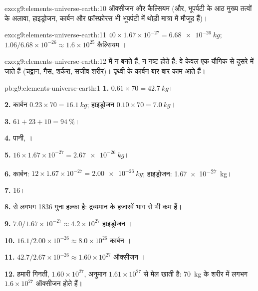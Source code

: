 \begin{solution}{exo:g9:elements-universe-earth:10}
ऑक्सीजन और कैल्सियम (और, भूपर्पटी के आठ मुख्य तत्वों के अलावा,
हाइड्रोजन, कार्बन और फ़ॉस्फ़ोरस भी भूपर्पटी में थोड़ी मात्रा में
मौजूद हैं)।
\end{solution}

\begin{solution}{exo:g9:elements-universe-earth:11}
$40 \times 1.67 \times 10^{-27} = \qty{6.68e-26}{kg}$;
$1.06 / 6.68 \times 10^{-26} \approx 1.6 \times 10^{25}$ कैल्सियम ।
\end{solution}

\begin{solution}{exo:g9:elements-universe-earth:12}
 में  न बनते हैं, न नष्ट होते हैं: वे केवल एक यौगिक से
दूसरे में जाते हैं (चट्टान, गैस, शर्करा, सजीव शरीर)। पृथ्वी के
कार्बन  बार-बार काम आते हैं।
\end{solution}

\begin{solution}{pb:g9:elements-universe-earth:1}
\textbf{1.} $0.61 \times 70 = \qty{42.7}{kg}$।

\textbf{2.} कार्बन $0.23 \times 70 = \qty{16.1}{kg}$; हाइड्रोजन
$0.10 \times 70 = \qty{7.0}{kg}$।

\textbf{3.} $61 + 23 + 10 = \qty{94}{\percent}$।

\textbf{4.} पानी, ।

\textbf{5.} $16 \times 1.67 \times 10^{-27} = \qty{2.67e-26}{kg}$।

\textbf{6.} कार्बन: $12 \times 1.67 \times 10^{-27} = \qty{2.00e-26}{kg}$;
हाइड्रोजन: \qty{1.67e-27}{kg}।

\textbf{7.} 16।

\textbf{8.}   से लगभग 1836 गुना हल्का है: 
द्रव्यमान के हज़ारवें भाग से भी कम हैं।

\textbf{9.} $7.0 / 1.67 \times 10^{-27} \approx 4.2 \times 10^{27}$
हाइड्रोजन ।

\textbf{10.} $16.1 / 2.00 \times 10^{-26} \approx 8.0 \times 10^{26}$
कार्बन ।

\textbf{11.} $42.7 / 2.67 \times 10^{-26} \approx 1.60 \times 10^{27}$
ऑक्सीजन ।

\textbf{12.} हमारी गिनती, $1.60 \times 10^{27}$, अनुमान
$1.61 \times 10^{27}$ से मेल खाती है: \qty{70}{kg} के शरीर में लगभग $1.6 \times
10^{27}$ ऑक्सीजन  होते हैं।
\end{solution}
